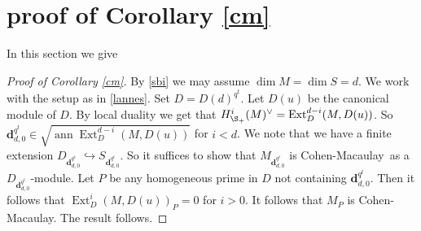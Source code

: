 \documentclass{amsart}
\newcommand{\CM}{Cohen-Macaulay}
\newcommand{\db}{\mathbf{d} }
\newcommand{\ann}{\operatorname{ann}}
\newcommand{\Ext}{\operatorname{Ext}}
\theoremstyle{plain}
\theoremstyle{definition}
\theoremstyle{remark}
\begin{document}
\section{proof of Corollary \ref{cm}}
In this section we give
\begin{proof}[Proof of Corollary \ref{cm}]
By \ref{sbi} we may assume $\dim M = \dim S = d$.
  We work with the setup as in \ref{lannes}.  Set $D = D(d)^{q^t}$. Let $D(u)$ be the canonical module of $D$. By local duality we get that $H^i_{\S_+}(M)^\vee = \Ext^{d-i}_D(M, D(u)) $. So $\db_{d,0}^{q^t} \in \sqrt{\ann\Ext^{d-i}_D(M, D(u))}$ for $i < d$. We note that we have a finite extension $D_{\db_{d,0}^{q^t} }\hookrightarrow S_{\db_{d,0}^{q^t} }$. So it suffices to show that $M_{\db_{d,0}^{q^t}}$ is \CM \ as a $D_{\db_{d,0}^{q^t}}$-module. Let $P$ be any homogeneous prime  in $D$ not containing $\db_{d,0}^{q^t}$. Then it follows that $\Ext^{i}_D(M, D(u))_P = 0$ for $i > 0$. It follows that $M_P$ is \CM. The result follows.
\end{proof}
\end{document}
